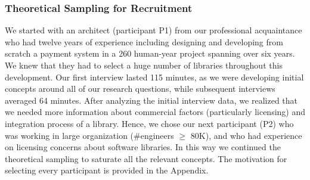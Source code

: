 


\subsubsection{Theoretical Sampling for Recruitment}
We started with an architect (participant P1) from our professional acquaintance who had twelve years of experience including designing and developing from scratch a payment system in a 260 human-year project spanning over six years. We knew that they had to select a huge number of libraries throughout this development. Our first interview lasted  115 minutes, as we were developing initial concepts around all of our research questions, while subsequent interviews averaged 64 minutes. %
After analyzing the initial interview data, we realized that we needed more information about commercial factors (particularly licensing) and integration process of a library. Hence, we chose our next participant (P2) who was working in large organization (\#engineers $\geq$ 80K), and who had experience on licensing concerns about software libraries. In this way we continued the theoretical sampling to saturate all the relevant concepts. The motivation for selecting every participant is provided in the Appendix. 


